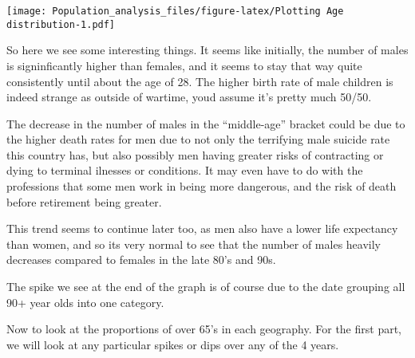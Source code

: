 \documentclass[]{article}
\begin{document}
\texttt{[image: Population\_analysis\_files/figure-latex/Plotting Age distribution-1.pdf]}

So here we see some interesting things. It seems like initially, the
number of males is signinficantly higher than females, and it seems to
stay that way quite consistently until about the age of 28. The higher
birth rate of male children is indeed strange as outside of wartime,
youd assume it's pretty much 50/50.

The decrease in the number of males in the ``middle-age'' bracket could
be due to the higher death rates for men due to not only the terrifying
male suicide rate this country has, but also possibly men having greater
risks of contracting or dying to terminal ilnesses or conditions. It may
even have to do with the professions that some men work in being more
dangerous, and the risk of death before retirement being greater.

This trend seems to continue later too, as men also have a lower life
expectancy than women, and so its very normal to see that the number of
males heavily decreases compared to females in the late 80's and 90s.

The spike we see at the end of the graph is of course due to the date
grouping all 90+ year olds into one category.

Now to look at the proportions of over 65's in each geography. For the
first part, we will look at any particular spikes or dips over any of
the 4 years.
\end{document}

